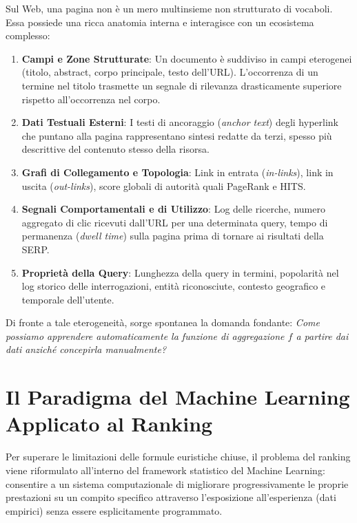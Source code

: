 Sul Web, una pagina non \`e un mero multinsieme non strutturato di vocaboli. Essa possiede una ricca anatomia interna e interagisce con un ecosistema complesso:
\begin{enumerate}
    \item \textbf{Campi e Zone Strutturate}: Un documento \`e suddiviso in campi eterogenei (titolo, abstract, corpo principale, testo dell'URL). L'occorrenza di un termine nel titolo trasmette un segnale di rilevanza drasticamente superiore rispetto all'occorrenza nel corpo.
    \item \textbf{Dati Testuali Esterni}: I testi di ancoraggio (\textit{anchor text}) degli hyperlink che puntano alla pagina rappresentano sintesi redatte da terzi, spesso pi\`u descrittive del contenuto stesso della risorsa.
    \item \textbf{Grafi di Collegamento e Topologia}: Link in entrata (\textit{in-links}), link in uscita (\textit{out-links}), score globali di autorit\`a quali PageRank e HITS.
    \item \textbf{Segnali Comportamentali e di Utilizzo}: Log delle ricerche, numero aggregato di clic ricevuti dall'URL per una determinata query, tempo di permanenza (\textit{dwell time}) sulla pagina prima di tornare ai risultati della SERP.
    \item \textbf{Propriet\`a della Query}: Lunghezza della query in termini, popolarit\`a nel log storico delle interrogazioni, entit\`a riconosciute, contesto geografico e temporale dell'utente.
\end{enumerate}

Di fronte a tale eterogeneit\`a, sorge spontanea la domanda fondante: \emph{Come possiamo apprendere automaticamente la funzione di aggregazione $f$ a partire dai dati anzich\'e concepirla manualmente?}

\FloatBarrier
\section{Il Paradigma del Machine Learning Applicato al Ranking}
\label{sec:paradigma-machine-learning-ranking}

Per superare le limitazioni delle formule euristiche chiuse, il problema del ranking viene riformulato all'interno del framework statistico del Machine Learning: consentire a un sistema computazionale di migliorare progressivamente le proprie prestazioni su un compito specifico attraverso l'esposizione all'esperienza (dati empirici) senza essere esplicitamente programmato.

